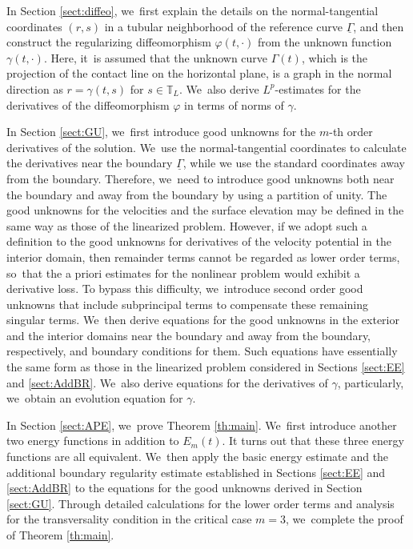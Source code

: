 \documentclass[11pt]{article}
\newcommand{\ul}[1]{\underline{#1}}
\newcommand{\itGamma}{\mathit{\Gamma}}
\theoremstyle{definition}
\begin{document}
In Section \ref{sect:diffeo}, we~first explain the details on the normal-tangential coordinates $(r,s)$ in a tubular neighborhood
of the reference curve $\ul{\itGamma}$, and then construct the regularizing diffeomorphism $\varphi(t,\cdot)$ from the unknown function $\gamma(t,\cdot)$.
Here, it~is assumed that the unknown curve $\itGamma(t)$, which is the projection of the contact line on the horizontal plane,
is a graph in the normal direction as $r=\gamma(t,s)$ for $s\in\mathbb{T}_L$. We~also derive $L^p$-estimates for the derivatives of the diffeomorphism $\varphi$ in terms of norms of $\gamma$.

In Section \ref{sect:GU}, we~first introduce good unknowns for the $m$-th order derivatives of the solution. We~use the normal-tangential coordinates to calculate the derivatives near the boundary $\ul{\itGamma}$,
while we use the standard coordinates away from the boundary.
Therefore, we~need to introduce good unknowns both near the boundary and away from the boundary by using a partition of unity.
The good unknowns for the velocities and the surface elevation may be defined in the same way as those of the linearized problem.
However, if we adopt such a definition to the good unknowns for derivatives of the velocity potential in the interior domain,
then remainder terms cannot be regarded as lower order terms, so~that the a priori estimates for the nonlinear problem would exhibit a derivative loss.
To bypass this difficulty, we~introduce second order good unknowns that include subprincipal terms to compensate these remaining singular terms. We~then derive equations for the good unknowns in the exterior and the interior domains near the boundary and away from the boundary, respectively,
and boundary conditions for them.
Such equations have essentially the same form as those in the linearized problem considered in Sections \ref{sect:EE} and \ref{sect:AddBR}. We~also derive equations for the derivatives of $\gamma$, particularly, we~obtain an evolution equation for $\gamma$.

In Section \ref{sect:APE}, we~prove Theorem \ref{th:main}. We~first introduce another two energy functions in addition to $E_m(t)$.
It turns out that these three energy functions are all equivalent. We~then apply the basic energy estimate and the additional boundary regularity estimate established in Sections \ref{sect:EE} and \ref{sect:AddBR}
to the equations for the good unknowns derived in Section \ref{sect:GU}.
Through detailed calculations for the lower order terms and analysis for the transversality condition in the critical case $m=3$, we~complete the proof of Theorem \ref{th:main}.
\end{document}
